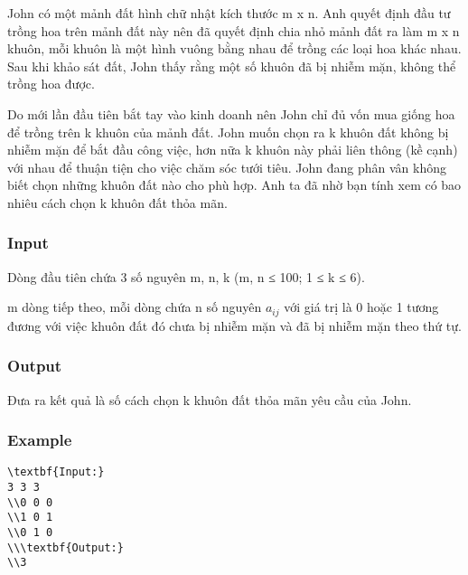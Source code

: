



   John có một mảnh đất hình chữ nhật kích thước m x n. Anh quyết định đầu tư trồng hoa trên mảnh đất này nên đã quyết định chia nhỏ mảnh đất ra làm m x n khuôn, mỗi khuôn là một hình vuông bằng nhau để trồng các loại hoa khác nhau. Sau khi khảo sát đất, John thấy rằng một số khuôn đã bị nhiễm mặn, không thể trồng hoa được.  

   Do mới lần đầu tiên bắt tay vào kinh doanh nên John chỉ đủ vốn mua giống hoa để trồng trên k khuôn của mảnh đất. John muốn chọn ra k khuôn đất không bị nhiễm mặn để bắt đầu công việc, hơn nữa k khuôn này phải liên thông (kề cạnh) với nhau để thuận tiện cho việc chăm sóc tưới tiêu. John đang phân vân không biết chọn những khuôn đất nào cho phù hợp. Anh ta đã nhờ bạn tính xem có bao nhiêu cách chọn k khuôn đất thỏa mãn.  

\subsubsection{   Input  }

   Dòng đầu tiên chứa 3 số nguyên m, n, k (m, n ≤ 100; 1 ≤ k ≤ 6).  

   m dòng tiếp theo, mỗi dòng chứa n số nguyên $a_{ij}$   với giá trị là 0 hoặc 1 tương đương với việc khuôn đất đó chưa bị nhiễm mặn và đã bị nhiễm mặn theo thứ tự.  

\subsubsection{   Output  }

   Đưa ra kết quả là số cách chọn k khuôn đất thỏa mãn yêu cầu của John.  

\subsubsection{   Example  }
\begin{verbatim}
\textbf{Input:}
3 3 3
\\0 0 0
\\1 0 1
\\0 1 0
\\\textbf{Output:}
\\3
\end{verbatim}
